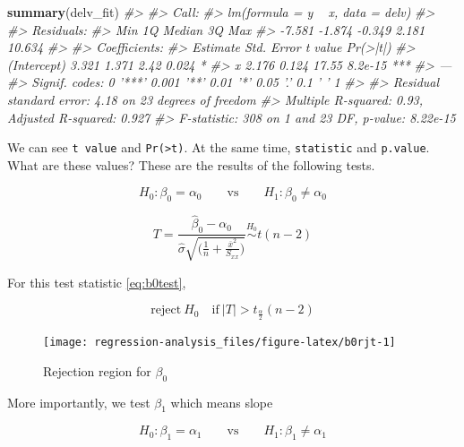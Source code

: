 \documentclass[]{book}
\newenvironment{Shaded}{\begin{snugshade}}{\end{snugshade}}
\newcommand{\CommentTok}[1]{\textcolor[rgb]{0.56,0.35,0.01}{\textit{#1}}}
\newcommand{\KeywordTok}[1]{\textcolor[rgb]{0.13,0.29,0.53}{\textbf{#1}}}
\newcommand{\NormalTok}[1]{#1}
\theoremstyle{definition}
\theoremstyle{definition}
\theoremstyle{definition}
\theoremstyle{remark}
\begin{document}
\begin{Shaded}
\begin{Highlighting}[]
\KeywordTok{summary}\NormalTok{(delv_fit)}
\CommentTok{#> }
\CommentTok{#> Call:}
\CommentTok{#> lm(formula = y ~ x, data = delv)}
\CommentTok{#> }
\CommentTok{#> Residuals:}
\CommentTok{#>    Min     1Q Median     3Q    Max }
\CommentTok{#> -7.581 -1.874 -0.349  2.181 10.634 }
\CommentTok{#> }
\CommentTok{#> Coefficients:}
\CommentTok{#>             Estimate Std. Error t value Pr(>|t|)    }
\CommentTok{#> (Intercept)    3.321      1.371    2.42    0.024 *  }
\CommentTok{#> x              2.176      0.124   17.55  8.2e-15 ***}
\CommentTok{#> ---}
\CommentTok{#> Signif. codes:  0 '***' 0.001 '**' 0.01 '*' 0.05 '.' 0.1 ' ' 1}
\CommentTok{#> }
\CommentTok{#> Residual standard error: 4.18 on 23 degrees of freedom}
\CommentTok{#> Multiple R-squared:  0.93,   Adjusted R-squared:  0.927 }
\CommentTok{#> F-statistic:  308 on 1 and 23 DF,  p-value: 8.22e-15}
\end{Highlighting}
\end{Shaded}

We can see \texttt{t\ value} and \texttt{Pr(\textgreater{}\textbar{}t\textbar{})}. At the same time, \texttt{statistic} and \texttt{p.value}. What are these values? These are the results of the following tests.

\[H_0 : \beta_0 = \alpha_0 \qquad \text{vs} \qquad H_1 : \beta_0 \neq \alpha_0\]

\begin{equation}
  T = \frac{\hat\beta_0 - \alpha_0}{\hat\sigma \sqrt{\bigg( \frac{1}{n} + \frac{\overline{x}^2}{S_{xx}} \bigg)}} \stackrel{H_0}{\sim} t(n - 2)
  \label{eq:b0test}
\end{equation}

For this test statistic \eqref{eq:b0test},

\[\text{reject}\: H_0 \quad \text{if} \: \lvert T \rvert > t_{\frac{\alpha}{2}}(n - 2)\]

\begin{figure}[H]

{\centering \texttt{[image: regression-analysis\_files/figure-latex/b0rjt-1]} 

}

\caption{Rejection region for $\beta_0$}\label{fig:b0rjt}
\end{figure}

More importantly, we test \(\beta_1\) which means slope

\[H_0 : \beta_1 = \alpha_1 \qquad \text{vs} \qquad H_1 : \beta_1 \neq \alpha_1\]
\end{document}

